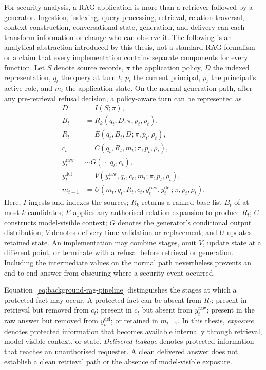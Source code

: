 For security analysis, a RAG application is more than a retriever followed by a generator. Ingestion, indexing, query processing, retrieval, relation traversal, context construction, conversational state, generation, and delivery can each transform information or change who can observe it. The following is an analytical abstraction introduced by this thesis, not a standard RAG formalism or a claim that every implementation contains separate components for every function. Let $S$ denote source records, $\pi$ the application policy, $D$ the indexed representation, $q_t$ the query at turn $t$, $p_t$ the current principal, $\rho_t$ the principal's active role, and $m_t$ the application state. On the normal generation path, after any pre-retrieval refusal decision, a policy-aware turn can be represented as
\begin{align}
  D &= I(S;\pi), \nonumber\\
  B_t &= R_k(q_t,D;\pi,p_t,\rho_t), \nonumber\\
  R_t &= E(q_t,B_t,D;\pi,p_t,\rho_t), \nonumber\\
  c_t &= C(q_t,R_t,m_t;\pi,p_t,\rho_t), \nonumber\\
  y^{\mathrm{raw}}_t &\sim G(\,\cdot\mid q_t,c_t), \nonumber\\
  y^{\mathrm{del}}_t &= V(y^{\mathrm{raw}}_t,q_t,c_t,m_t;\pi,p_t,\rho_t), \nonumber\\
  m_{t+1} &= U(m_t,q_t,R_t,c_t,y^{\mathrm{raw}}_t,y^{\mathrm{del}}_t;\pi,p_t,\rho_t).
  \label{eq:background-rag-pipeline}
\end{align}
Here, $I$ ingests and indexes the sources; $R_k$ returns a ranked base list $B_t$ of at most $k$ candidates; $E$ applies any authorised relation expansion to produce $R_t$; $C$ constructs model-visible context; $G$ denotes the generator's conditional output distribution; $V$ denotes delivery-time validation or replacement; and $U$ updates retained state. An implementation may combine stages, omit $V$, update state at a different point, or terminate with a refusal before retrieval or generation. Including the intermediate values on the normal path nevertheless prevents an end-to-end answer from obscuring where a security event occurred.

Equation~\ref{eq:background-rag-pipeline} distinguishes the stages at which a protected fact may occur. A protected fact can be absent from $R_t$; present in retrieval but removed from $c_t$; present in $c_t$ but absent from $y^{\mathrm{raw}}_t$; present in the raw answer but removed from $y^{\mathrm{del}}_t$; or retained in $m_{t+1}$. In this thesis, \emph{exposure} denotes protected information that becomes available internally through retrieval, model-visible context, or state. \emph{Delivered leakage} denotes protected information that reaches an unauthorised requester. A clean delivered answer does not establish a clean retrieval path or the absence of model-visible exposure.

